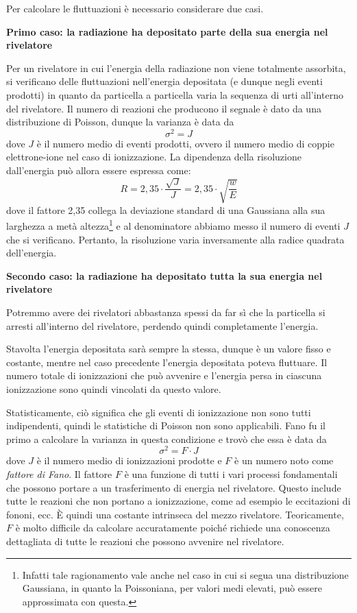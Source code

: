 Per calcolare le fluttuazioni è necessario considerare due casi.

\newpage

\textbf{Primo caso: la radiazione ha depositato parte della sua energia nel rivelatore}

Per un rivelatore in cui l'energia della radiazione non viene totalmente assorbita, si verificano delle fluttuazioni nell'energia depositata (e dunque negli eventi prodotti) in quanto da particella a particella varia la sequenza di urti all'interno del rivelatore. Il numero di reazioni che producono il segnale è dato da una distribuzione di Poisson, dunque la varianza è data da
\begin{equation*}
   \sigma^2 = J
\end{equation*}
dove $J$ è il numero medio di eventi prodotti, ovvero il numero medio di coppie elettrone-ione nel caso di ionizzazione. La dipendenza della risoluzione dall'energia può allora essere espressa come:
\begin{equation*}
   R
   =2,35 \cdot \frac{\sqrt{J}}{J}
   =2,35 \cdot \sqrt{\frac{w}{E}}
\end{equation*}
dove il fattore 2,35 collega la deviazione standard di una Gaussiana alla sua larghezza a metà altezza\footnote{Infatti tale ragionamento vale anche nel caso in cui si segua una distribuzione Gaussiana, in quanto la Poissoniana, per valori medi elevati, può essere approssimata con questa.} e al denominatore abbiamo messo il numero di eventi $J$ che si verificano. Pertanto, la risoluzione varia inversamente alla radice quadrata dell'energia.

\vspace{0.2cm}\textbf{Secondo caso: la radiazione ha depositato tutta la sua energia nel rivelatore}

Potremmo avere dei rivelatori abbastanza spessi da far sì che la particella si arresti all'interno del rivelatore, perdendo quindi completamente l'energia.

Stavolta l'energia depositata sarà sempre la stessa, dunque è un valore fisso e costante, mentre nel caso precedente l'energia depositata poteva fluttuare. Il numero totale di ionizzazioni che può avvenire e l'energia persa in ciascuna ionizzazione sono quindi vincolati da questo valore.

Statisticamente, ciò significa che gli eventi di ionizzazione non sono tutti indipendenti, quindi le statistiche di Poisson non sono applicabili. Fano fu il primo a calcolare la varianza in questa condizione e trovò che essa è data da
\begin{equation*}
   \sigma^2 = F \cdot J
\end{equation*}
dove $J$ è il numero medio di ionizzazioni prodotte e $F$ è un numero noto come \textit{fattore di Fano}. Il fattore $F$ è una funzione di tutti i vari processi fondamentali che possono portare a un trasferimento di energia nel rivelatore. Questo include tutte le reazioni che non portano a ionizzazione, come ad esempio le eccitazioni di fononi, ecc. È quindi una costante intrinseca del mezzo rivelatore. Teoricamente, $F$ è molto difficile da calcolare accuratamente poiché richiede una conoscenza dettagliata di tutte le reazioni che possono avvenire nel rivelatore.

